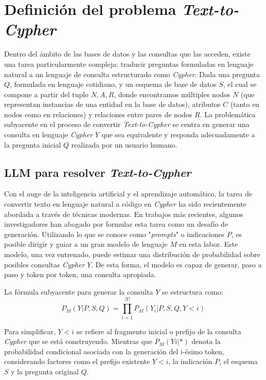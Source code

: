 \section{Definición del problema \textit{Text-to-Cypher}} \label{problem_definition}
Dentro del ámbito de las bases de datos y las consultas que las acceden, existe una tarea particularmente compleja: traducir preguntas formuladas en lenguaje natural a un lenguaje de consulta estructurado como \textit{Cypher}. Dada una pregunta $Q$, formulada en lenguaje cotidiano, y un esquema de base de datos $S$, el cual se compone a partir del tuplo ${N, A, R}$, donde encontramos múltiples nodos $N$ (que representan instancias de una entidad en la base de datos), atributos $C$ (tanto en nodos como en relaciones) y relaciones entre pares de nodos $R$. La problemática subyacente en el proceso de convertir \textit{Text-to-Cypher} se centra en generar una consulta en lenguaje \textit{Cypher} $Y$ que sea equivalente y responda adecuadamente a la pregunta inicial $Q$ realizada por un usuario humano.

\subsection{LLM para resolver \textit{Text-to-Cypher}} \label{llmfortext2cypher}

Con el auge de la inteligencia artificial y el aprendizaje automático, la tarea de convertir texto en lenguaje natural a código en \textit{Cypher} ha sido recientemente abordada a través de técnicas modernas. En trabajos más recientes, algunos investigadores \cite{sunetal2023} \cite{liuetal2023} han abogado por formular esta tarea como un desafío de generación. Utilizando lo que se conoce como "\textit{prompts}" o indicaciones $P$, es posible dirigir y guiar a un gran modelo de lenguaje $M$ en esta labor. Este modelo, una vez entrenado, puede estimar una distribución de probabilidad sobre posibles consultas \textit{Cypher} $Y$. De esta forma, el modelo es capaz de generar, paso a paso y token por token, una consulta apropiada.

La fórmula subyacente para generar la consulta $Y$ se estructura como:
$$P_M(Y|P, S, Q) = \prod_{i=1}^{|Y|}{P_M(Y_i | P, S, Q, Y < i)}$$ \label{llm_query_generation}

Para simplificar, $Y< i$ se refiere al fragmento inicial o prefijo de la consulta \textit{Cypher} que se está construyendo. Mientras que $P_M(Yi|*)$ denota la probabilidad condicional asociada con la generación del i-ésimo token, considerando factores como el prefijo existente $Y<i$, la indicación $P$, el esquema $S$ y la pregunta original $Q$.

